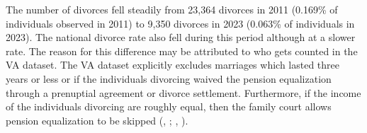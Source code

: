 \documentclass[a4paper,12pt]{article}
\theoremstyle{plain}
\theoremstyle{definition}
\theoremstyle{TheoremNum}
\theoremstyle{CorollaryNum}
\theoremstyle{PropositionNum}
\theoremstyle{TheoremNum}
\begin{document}


The number of divorces fell steadily from 23,364 divorces in 2011 (0.169\% of individuals observed in 2011) to 9,350 divorces in 2023 (0.063\% of individuals in 2023). The national divorce rate also fell during this period although at a slower rate. The reason for this difference may be attributed to who gets counted in the VA dataset. The VA dataset explicitly excludes marriages which lasted three years or less or if the individuals divorcing waived the pension equalization through a prenuptial agreement or divorce settlement. Furthermore, if the income of the individuals divorcing are roughly equal, then the family court allows pension equalization to be skipped (\citeauthor{VersAusglG2009}, \citeyear{VersAusglG2009}; \citeauthor{MuKoBGB2025Bd9}, \citeyear{MuKoBGB2025Bd9}). 
\end{document}
